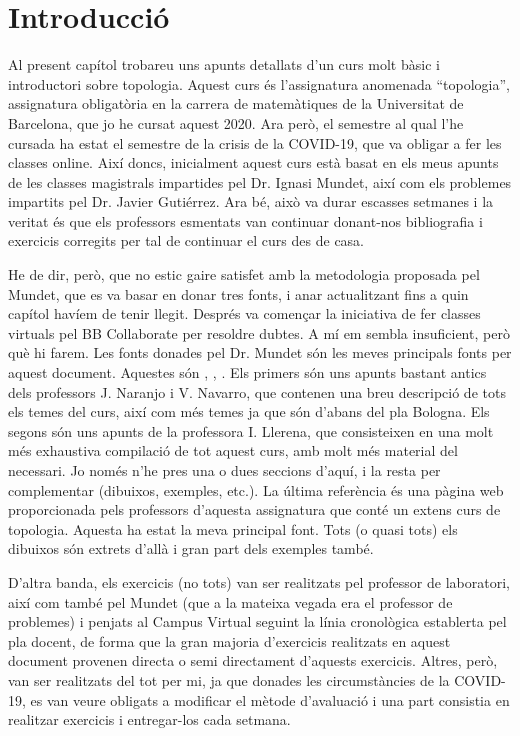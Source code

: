 \documentclass[../main.tex]{subfiles}
\begin{document}
\chapter*{Introducció}

Al present capítol trobareu uns apunts detallats d'un curs molt bàsic i introductori sobre topologia. Aquest curs és l'assignatura anomenada ``topologia'', assignatura obligatòria en la carrera de matemàtiques de la Universitat de Barcelona, que jo he cursat aquest 2020. Ara però, el semestre al qual l'he cursada ha estat el semestre de la crisis de la COVID-19, que va obligar a fer les classes online. Així doncs, inicialment aquest curs està basat en els meus apunts de les classes magistrals impartides pel Dr. Ignasi Mundet, així com els problemes impartits pel Dr. Javier Gutiérrez. Ara bé, això va durar escasses setmanes i la veritat és que els professors esmentats van continuar donant-nos bibliografia i exercicis corregits per tal de continuar el curs des de casa.

He de dir, però, que no estic gaire satisfet amb la metodologia proposada pel Mundet, que es va basar en donar tres fonts, i anar actualitzant fins a quin capítol havíem de tenir llegit. Després va començar la iniciativa de fer classes virtuals pel BB Collaborate per resoldre dubtes. A mí em sembla insuficient, però què hi farem. Les fonts donades pel Dr. Mundet són les meves principals fonts per aquest document. Aquestes són \cite{naranjo}, \cite{llerena}, \cite{mathonline}. Els primers són uns apunts bastant antics dels professors J. Naranjo i V. Navarro, que contenen una breu descripció de tots els temes del curs, així com més temes ja que són d'abans del pla Bologna. Els segons són uns apunts de la professora I. Llerena, que consisteixen en una molt més exhaustiva compilació de tot aquest curs, amb molt més material del necessari. Jo només n'he pres una o dues seccions d'aquí, i la resta per complementar (dibuixos, exemples, etc.). La última referència és una pàgina web proporcionada pels professors d'aquesta assignatura que conté un extens curs de topologia. Aquesta ha estat la meva principal font. Tots (o quasi tots) els dibuixos són extrets d'allà i gran part dels exemples també.

D'altra banda, els exercicis (no tots) van ser realitzats pel professor de laboratori, així com també pel Mundet (que a la mateixa vegada era el professor de problemes) i penjats al Campus Virtual seguint la línia cronològica establerta pel pla docent, de forma que la gran majoria d'exercicis realitzats en aquest document provenen directa o semi directament d'aquests exercicis. Altres, però, van ser realitzats del tot per mi, ja que donades les circumstàncies de la COVID-19, es van veure obligats a modificar el mètode d'avaluació i una part consistia en realitzar exercicis i entregar-los cada setmana.
\end{document}
